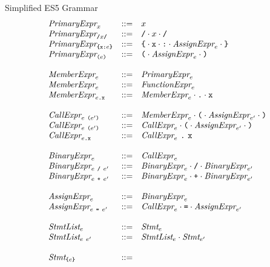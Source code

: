 \documentclass[preprint,10pt]{sigplanconf}
\begin{document}
\begin{displayfigure*}{\label{fig:grammar}Simplified ES5 Grammar}
\[
\begin{array}{lcl}
  \textit{PrimaryExpr}_{x} &::=& x
  \\
  \textit{PrimaryExpr}_{\texttt{/}x\texttt{/}} &::=& \texttt{/} \cdot x \cdot \texttt{/}
  \\
  \textit{PrimaryExpr}_{\texttt{\{}\texttt{x} \texttt{:} e\texttt{\}}} &::=& 
  \texttt{\{}\cdot \texttt{x} \cdot \texttt{:} \cdot  \textit{AssignExpr}_{e}
    \cdot \texttt{\}}
  \\
  \textit{PrimaryExpr}_{\texttt{(}e\texttt{)}} &::=& 
  \texttt{(}\cdot \textit{AssignExpr}_{e} \cdot \texttt{)}
  \\ \\
  \textit{MemberExpr}_{e} &::=&
  \textit{PrimaryExpr}_{e}
  \\
  \textit{MemberExpr}_{e} &::=&
  \textit{FunctionExpr}_{e}
  \\
  \textit{MemberExpr}_{e\texttt{.\texttt{x}}} &::=&
  \textit{MemberExpr}_{e} \cdot \texttt{.} \cdot \texttt{x}
  \\ \\
  \textit{CallExpr}_{e~\texttt{(}e'\texttt{)}} &::=& 
  \textit{MemberExpr}_{e} \cdot
  \texttt{(}\cdot \textit{AssignExpr}_{e'} \cdot \texttt{)}
  \\
  \textit{CallExpr}_{e~\texttt{(}e'\texttt{)}} &::=& 
  \textit{CallExpr}_{e} \cdot
  \texttt{(}\cdot \textit{AssignExpr}_{e'} \cdot \texttt{)}
  \\
  \textit{CallExpr}_{e\texttt{.\texttt{x}}} &::=& 
  \textit{CallExpr}_{e}~\texttt{.}~
  \texttt{x}
  \\ \\
  \textit{BinaryExpr}_{e} &::=& \textit{CallExpr}_{e} \\
  \textit{BinaryExpr}_{e ~\texttt{/}~ e'}
  &::=&
  \textit{BinaryExpr}_{e} \cdot \texttt{/} \cdot  \textit{BinaryExpr}_{e'} \\
  \textit{BinaryExpr}_{e ~\texttt{+}~ e'}
  &::=&
  \textit{BinaryExpr}_{e} \cdot \texttt{+} \cdot \textit{BinaryExpr}_{e'}
  \\ \\
  \textit{AssignExpr}_{e} &::=&
  \textit{BinaryExpr}_{e}
  \\
  \textit{AssignExpr}_{e~\texttt{=}~e'} &::=&
  \textit{CallExpr}_{e} \cdot \texttt{=} \cdot
  \textit{AssignExpr}_{e'}
  \\ \\
  \textit{StmtList}_{e} &::=&
  \textit{Stmt}_{e}
  \\
  \textit{StmtList}_{e~e'} &::=&
  \textit{StmtList}_{e} \cdot
  \textit{Stmt}_{e'}
  \\ \\
  \textit{Stmt}_{\texttt{\{}e\texttt{\}}} &::=& 

\end{array}\]
\end{displayfigure*}
\end{document}
